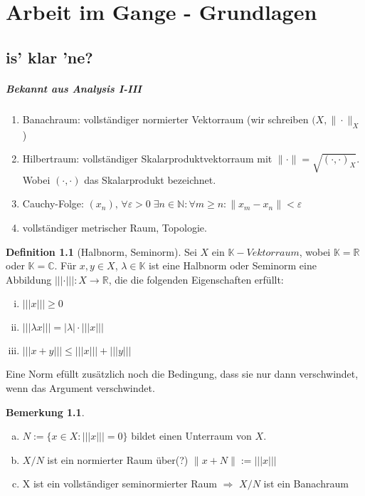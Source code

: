 \documentclass[ngerman]{report}
\theoremstyle{plain}%
\theoremstyle{definition}%
\newtheorem{definition}[thm]{Definition}
\theoremstyle{myStyle}
\newtheorem{bem}[thm]{Bemerkung}
\newcommand{\C}{\mathbb{C}}
\newcommand{\R}{\mathbb{R}}
\newcommand{\N}{\mathbb{N}}
\newcommand{\K}{\mathbb{K}}
\newcommand{\seminorm}[1]{||| #1 |||}
\newcommand{\norm}[1]{\|#1\|}
\begin{document}

\chapter{Arbeit im Gange - Grundlagen}
\section{is' klar 'ne?}

\paragraph{Bekannt aus Analysis I-III}

\begin{enumerate}[-]
	\item Banachraum: vollständiger normierter Vektorraum (wir schreiben $(X,\norm{\cdot }_X$) 
	\item Hilbertraum: vollständiger Skalarproduktvektorraum mit $\norm{\cdot } = \sqrt{(\cdot , \cdot )_X}$.  Wobei $(\cdot , \cdot )$ das Skalarprodukt bezeichnet.
	\item Cauchy-Folge: 
					$(x_n),\,  \forall \varepsilon > 0\; \exists n \in \N : \forall m \geq n : \norm{x_m-x_n}<\varepsilon$
	\item vollständiger metrischer Raum, Topologie.
\end{enumerate}

\begin{definition}[Halbnorm, Seminorm]

	Sei $X$ ein $\K-Vektorraum$, wobei $\K = \R$ oder $\K = \C$. 
	Für $x,y\in X$, $\lambda \in \K$ ist eine Halbnorm oder Seminorm eine Abbildung
	$\seminorm{\cdot}:X \rightarrow \R$, die die folgenden Eigenschaften erfüllt:

		\begin{enumerate}[(i)]
			\item $\seminorm{x}\geq 0$
			\item $\seminorm{\lambda x} = |\lambda|\cdot \seminorm{x}$
			\item $\seminorm{x+y} \leq \seminorm{x} + \seminorm{y}$
		\end{enumerate}
\end{definition}

Eine Norm efüllt zusätzlich noch die Bedingung, dass sie nur dann verschwindet, wenn das Argument verschwindet.

\begin{bem}
	\begin{enumerate}[(a)]
		\item $N:=\{x\in X: \seminorm{x}=0\}$ bildet einen Unterraum von $X$.
		\item $X/N$ ist ein normierter Raum über(?) $\norm{x+N} := \seminorm{x}$
		\item X ist ein vollständiger seminormierter Raum $\Rightarrow$ $X/N$ ist ein Banachraum 
	\end{enumerate}
\end{bem}
\end{document}
